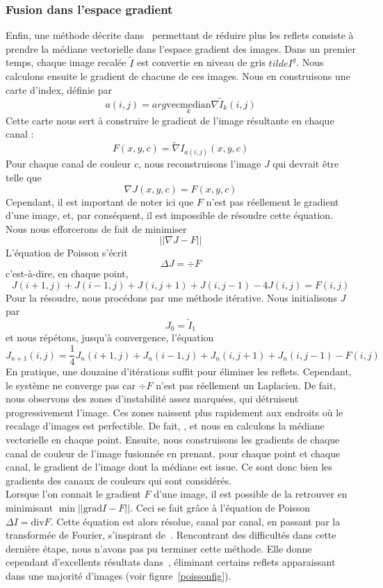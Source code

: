 \documentclass[12pt,a4paper]{article}
\begin{document}
\subsubsection{Fusion dans l'espace gradient}
\centering
\label{fusiongrad}
Enfin, une méthode décrite dans~\citep{haro2012photographing} permettant de réduire plus les reflets consiste à prendre la médiane vectorielle dans l'espace gradient des images. Dans un premier temps, chaque image recalée $\tilde I$ est convertie en niveau de gris $tilde I^g$. Nous calculons ensuite le gradient de chacune de ces images. Nous en construisons une carte d'index, définie par
\[
a(i,j) = arg\underset{k}{\mathrm{vecmedian}}\nabla\tilde I_k(i,j)
\]
Cette carte nous sert à construire le gradient de l'image résultante en chaque canal :
\[
F(x,y,c) = \tilde \nabla I_{a(i,j)}(x,y,c)
\]
Pour chaque canal de couleur $c$, nous reconstruisons l'image $J$ qui devrait être telle que
\[
\nabla J(x,y,c) = F(x,y,c)
\]
Cependant, il est important de noter ici que $F$ n'est pas réellement le gradient d'une image, et, par conséquent, il est impossible de résoudre cette équation. Nous nous efforcerons de fait de minimiser
\[
||\nabla J - F||
\]
L'équation de Poisson s'écrit
\[
\Delta J = \div F
\]
c'est-à-dire, en chaque point,
\[
J(i+1,j)+J(i-1,j)+J(i,j+1)+J(i,j-1)-4J(i,j)=F(i,j)
\]
Pour la résoudre, nous procédons par une méthode itérative. Nous initialisons $J$ par
\[J_0 = \tilde I_1\]
et nous répétons, jusqu'à convergence, l'équation
\[
J_{n+1}(i,j) = \frac{1}{4}J_n(i+1,j)+J_n(i-1,j)+J_n(i,j+1)+J_n(i,j-1)-F(i,j)
\]
En pratique, une douzaine d'itérations suffit pour éliminer les reflets. Cependant, le système ne converge pas car $\div F$ n'est pas réellement un Laplacien. De fait, nous observons des zones d'instabilité assez marquées, qui détruisent progressivement l'image. Ces zones naissent plus rapidement aux endroits où le recalage d'images est perfectible. De fait, 
, et nous en calculons la médiane vectorielle en chaque point. Ensuite, nous construisons les gradients de chaque canal de couleur de l'image fusionnée en prenant, pour chaque point et chaque canal, le gradient de l'image dont la médiane est issue. Ce sont donc bien les gradients des canaux de couleurs qui sont considérés.\\
Lorsque l'on connait le gradient $F$ d'une image, il est possible de la retrouver en minimisant $\min||\mathrm{grad}I - F||$. Ceci se fait grâce à l'équation de Poisson $\Delta I = \mathrm{div}F$. Cette équation est alors résolue, canal par canal, en passant par la transformée de Fourier, s'inspirant de~\citep{morel2010pde}. Rencontrant des difficultés dans cette dernière étape, nous n'avons pas pu terminer cette méthode. Elle donne cependant d'excellents résultats dans~\citep{haro2012photographing}, éliminant certains reflets apparaissant dans une majorité d'images (voir figure~\ref{poissonfig}).
\end{document}
